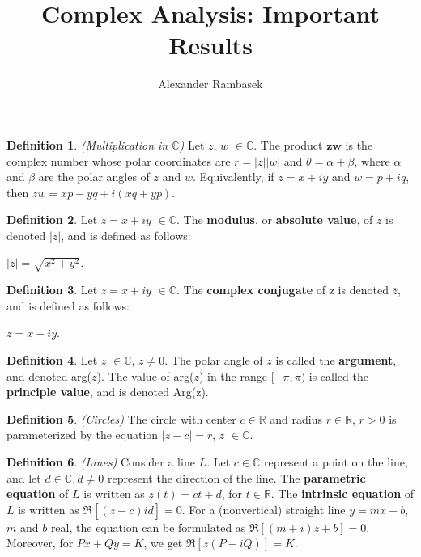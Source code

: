 \documentclass[a4paper]{article}
\title{Complex Analysis: Important Results}
\author{Alexander Rambasek}
\affil[]{MATH 324: Introduction to Complex Analysis}
\affil[]{Case Western Reserve University}
\affil[]{}
\theoremstyle{definition}
\newtheorem{definition}{Definition}
\begin{document}
	\maketitle
	
	
	\begin{definition}
		\emph{(Multiplication in $\mathbb{C}$)}
		Let $z$, $w$ $\in \mathbb{C}$. The product $\textbf{zw}$ is
		the complex number whose polar coordinates are $r = |z||w|$ and
		$\theta = \alpha + \beta$, where $\alpha$ and $\beta$ are the polar angles of $z$ and $w$. Equivalently, if $z = x + \textit{i}y$ and $w = p + \textit{i}q$, then $zw = xp - yq + \textit{i}(xq + yp)$.
	\end{definition}
	
	\begin{definition}
		Let $z = x + \textit{i}y$ $\in \mathbb{C}$. The \textbf{modulus}, or \textbf{absolute value}, of $z$ is denoted $|z|$, and is defined as follows:
		\begin{center}
			$|z| = \sqrt{x^2 + y^2}$.
		\end{center}
	\end{definition}
	
	\begin{definition}
		Let $z = x + \textit{i}y$ $\in \mathbb{C}$. The \textbf{complex conjugate} of z is denoted $\overline{z}$, and is defined as follows:
		\begin{center}
			$\overline{z} = x - \textit{i}y$.
		\end{center}
	\end{definition}
	
	\begin{definition}
		Let $z$ $\in \mathbb{C}$, $z \neq 0$. The polar angle of $z$ is called the \textbf{argument}, and denoted arg($z$). The value of arg($z$) in the range $[-\pi, \pi)$ is called the \textbf{principle value}, and is denoted Arg(z).
	\end{definition}
	
	\begin{definition}
		\emph{(Circles)}
		The circle with center $c \in \mathbb{R}$ and radius $r \in \mathbb{R}$, $r > 0$ is parameterized by the equation $|z - c| = r$, $z$ $\in \mathbb{C}$.
	\end{definition}
	
	\begin{definition}
		\emph{(Lines)}
		Consider a line $L$. Let $c \in \mathbb{C}$ represent a point on the line, and let $d \in \mathbb{C}, d \neq 0$ represent the direction of the line. The \textbf{parametric equation} of $L$ is written as $z(t) = ct + d$, for $t \in \mathbb{R}$. The \textbf{intrinsic equation} of $L$ is written as $\Re{[(z - c)i\overline{d}]} = 0$. For a (nonvertical) straight line $y = mx + b$, $m$ and $b$ real, the equation can be formulated as $\Re{[(m+i)z + b]} = 0$. Moreover, for $Px + Qy = K$, we get $\Re{[z(P - iQ)]} = K$.
	\end{definition}
	
\end{document}
